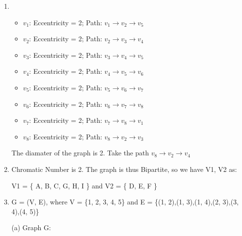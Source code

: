 \documentclass[a4paper]{article}
\begin{document}
\begin{enumerate}
    \item \begin{itemize}
        \item $v_1$: Eccentricity = 2; Path: $v_1 \rightarrow v_2 \rightarrow v_5$
        \item $v_2$: Eccentricity = 2; Path: $v_2 \rightarrow v_3 \rightarrow v_4$
        \item $v_3$: Eccentricity = 2; Path: $v_3 \rightarrow v_4 \rightarrow v_5$
        \item $v_4$: Eccentricity = 2; Path: $v_4 \rightarrow v_5 \rightarrow v_6$
        \item $v_5$: Eccentricity = 2; Path: $v_5 \rightarrow v_6 \rightarrow v_7$
        \item $v_6$: Eccentricity = 2; Path: $v_6 \rightarrow v_7 \rightarrow v_8$
        \item $v_7$: Eccentricity = 2; Path: $v_7 \rightarrow v_8 \rightarrow v_1$
        \item $v_8$: Eccentricity = 2; Path: $v_8 \rightarrow v_2 \rightarrow v_3$
    \end{itemize}

    The diamater of the graph is 2. Take the path $v_8 \rightarrow v_2 \rightarrow v_4$

    \item Chromatic Number is 2. The graph is thus Bipartite, so we have V1, V2 as:
    \begin{center}
        V1 = \{ A, B, C, G, H, I \} and V2 = \{ D, E, F \}
    \end{center}

    \item G = (V, E), where V = \{1, 2, 3, 4, 5\} and E = \{(1, 2),(1, 3),(1, 4),(2, 3),(3, 4),(4, 5)\}
    
    (a) Graph G:\\
    \\



\end{enumerate}
\end{document}
